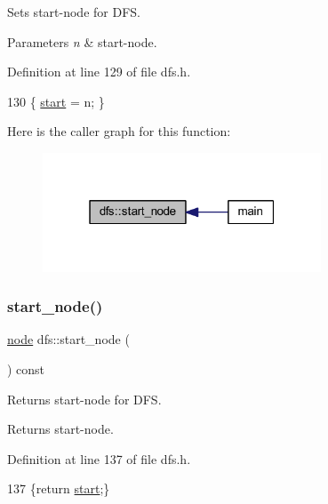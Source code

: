Sets start-\/node for D\+FS. 


\begin{DoxyParams}{Parameters}
{\em n} & start-\/node. \\
\hline
\end{DoxyParams}


Definition at line 129 of file dfs.\+h.


\begin{DoxyCode}
130     \{ \mbox{\hyperlink{classdfs_af677cfc31fe06a18dd3a3aae7f7d112b}{start}} = n; \}
\end{DoxyCode}
Here is the caller graph for this function\+:
\nopagebreak
\begin{figure}[H]
\begin{center}
\leavevmode
\includegraphics[width=235pt]{classdfs_aad21fd0d3036350fd341f877d5747852_icgraph}
\end{center}
\end{figure}
\mbox{\label{classdfs_a7688d8eaf1308438820fec2ffe21257c}} 
\subsubsection{\texorpdfstring{start\+\_\+node()}{start\_node()}\hspace{0.1cm}{\footnotesize\ttfamily [2/2]}}
{\footnotesize\ttfamily \mbox{\hyperlink{classnode}{node}} dfs\+::start\+\_\+node (\begin{DoxyParamCaption}{ }\end{DoxyParamCaption}) const\hspace{0.3cm}{\ttfamily [inline]}}



Returns start-\/node for D\+FS. 

\begin{DoxyReturn}{Returns}
start-\/node. 
\end{DoxyReturn}


Definition at line 137 of file dfs.\+h.


\begin{DoxyCode}
137 \{\textcolor{keywordflow}{return} \mbox{\hyperlink{classdfs_af677cfc31fe06a18dd3a3aae7f7d112b}{start}};\}
\end{DoxyCode}
\mbox{\label{classdfs_a6f54f1c4339eacc8961e795439d4593d}} 
